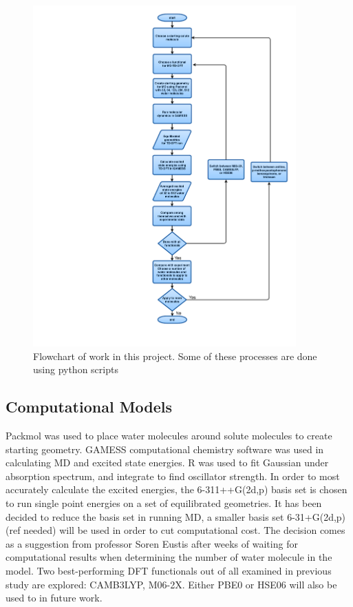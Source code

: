 \documentclass[
journal=jpcbfk, %
manuscript=article]{achemso}
\begin{document}
\begin{figure}[!htb]
	\centering		
	\includegraphics[width=0.9\textwidth]{flowchart.pdf}
	\caption{Flowchart of work in this project. Some of these processes are done using python scripts}
	\label{fig:flowchart}
\end{figure}

\subsection{Computational Models} 
Packmol was used to place water molecules around solute molecules to create starting geometry. GAMESS computational chemistry software was used in calculating MD and excited state energies. R was used to fit Gaussian under absorption spectrum, and integrate to find oscillator strength. In order to most accurately calculate the excited energies, the 6-311++G(2d,p) basis set is chosen to run single point energies on a set of equilibrated geometries. It has been decided to reduce the basis set in running MD, a smaller basis set 6-31+G(2d,p) (ref needed) will be used in order to cut computational cost. The decision comes as a suggestion from professor Soren Eustis after weeks of waiting for computational results when determining the number of water molecule in the model. Two best-performing DFT functionals out of all examined in previous study are explored: CAMB3LYP, M06-2X.\cite{Barnes2014} Either PBE0 or HSE06 will also be used to in future work.
\end{document}
